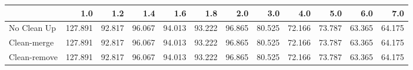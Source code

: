 \begin{tabular}{lrrrrrrrrrrr}
\toprule
{} &     1.0 &    1.2 &    1.4 &    1.6 &    1.8 &    2.0 &    3.0 &    4.0 &    5.0 &    6.0 &    7.0 \\
\midrule
No Clean Up  & 127.891 & 92.817 & 96.067 & 94.013 & 93.222 & 96.865 & 80.525 & 72.166 & 73.787 & 63.365 & 64.175 \\
Clean-merge  & 127.891 & 92.817 & 96.067 & 94.013 & 93.222 & 96.865 & 80.525 & 72.166 & 73.787 & 63.365 & 64.175 \\
Clean-remove & 127.891 & 92.817 & 96.067 & 94.013 & 93.222 & 96.865 & 80.525 & 72.166 & 73.787 & 63.365 & 64.175 \\
\bottomrule
\end{tabular}
